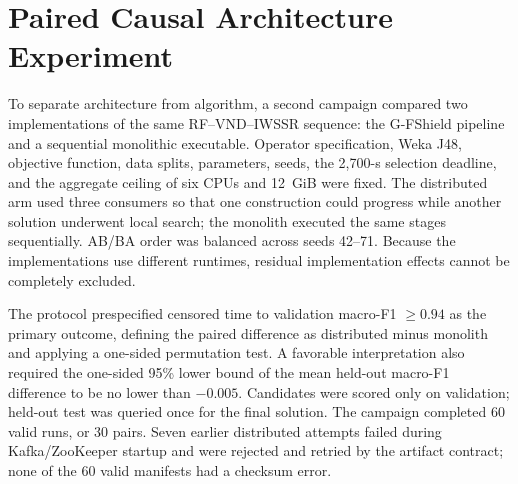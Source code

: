 \section{Paired Causal Architecture Experiment}
\label{sec:architecture-causal}

To separate architecture from algorithm, a second campaign compared two implementations of the same RF--VND--IWSSR sequence: the G-FShield pipeline and a sequential monolithic executable. Operator specification, Weka J48, objective function, data splits, parameters, seeds, the 2,700-s selection deadline, and the aggregate ceiling of six CPUs and 12~GiB were fixed. The distributed arm used three consumers so that one construction could progress while another solution underwent local search; the monolith executed the same stages sequentially. AB/BA order was balanced across seeds 42--71. Because the implementations use different runtimes, residual implementation effects cannot be completely excluded.

The protocol prespecified censored time to validation macro-F1 $\geq 0.94$ as the primary outcome, defining the paired difference as distributed minus monolith and applying a one-sided permutation test. A favorable interpretation also required the one-sided 95\% lower bound of the mean held-out macro-F1 difference to be no lower than $-0.005$. Candidates were scored only on validation; held-out test was queried once for the final solution. The campaign completed 60 valid runs, or 30 pairs. Seven earlier distributed attempts failed during Kafka/ZooKeeper startup and were rejected and retried by the artifact contract; none of the 60 valid manifests had a checksum error.

